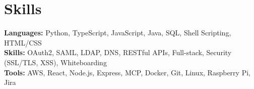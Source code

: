 \documentclass[11pt]{article}       %
\begin{document}
\vspace{-18.5pt}

\section*{Skills}
\textbf{Languages:} Python, TypeScript, JavaScript, Java, SQL, Shell Scripting, HTML/CSS\\
\textbf{Skills:} OAuth2, SAML, LDAP, DNS, RESTful APIs, Full-stack, Security (SSL/TLS, XSS), Whiteboarding\\
\textbf{Tools:} AWS, React, Node.js, Express, MCP, Docker, Git, Linux, Raspberry Pi, Jira\\

\vspace{-6.5pt}
\end{document}
